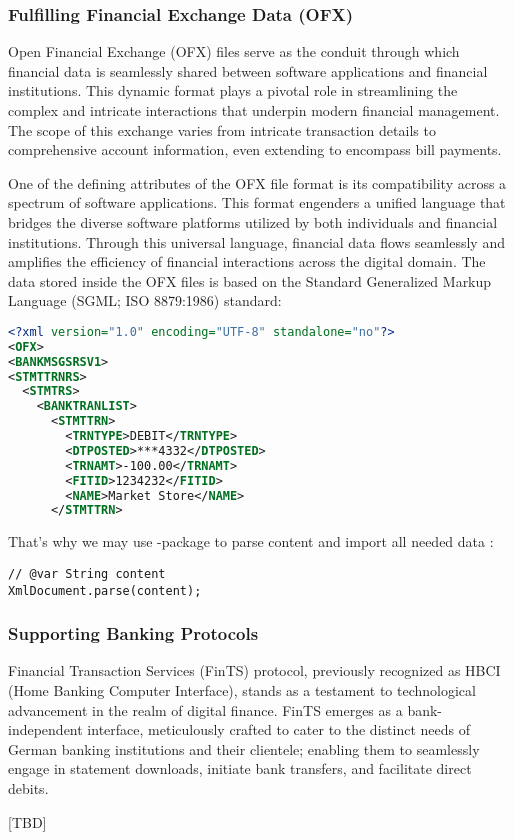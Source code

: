 \subsubsection{Fulfilling Financial Exchange Data (OFX)}

Open Financial Exchange (OFX) files serve as the conduit through which financial data is seamlessly shared between 
software applications and financial institutions. This dynamic format plays a pivotal role in streamlining the complex 
and intricate interactions that underpin modern financial management. The scope of this exchange varies from intricate 
transaction details to comprehensive account information, even extending to encompass bill payments.

One of the defining attributes of the OFX file format is its compatibility across a spectrum of software applications. 
This format engenders a unified language that bridges the diverse software platforms utilized by both individuals and 
financial institutions. Through this universal language, financial data flows seamlessly and amplifies the efficiency 
of financial interactions across the digital domain. The data stored inside the OFX files is based on the Standard 
Generalized Markup Language (SGML; ISO 8879:1986) standard:

\begin{lstlisting}[language=xml]
<?xml version="1.0" encoding="UTF-8" standalone="no"?>
<OFX>
<BANKMSGSRSV1>
<STMTTRNRS>
  <STMTRS>
    <BANKTRANLIST>
      <STMTTRN>
        <TRNTYPE>DEBIT</TRNTYPE>
        <DTPOSTED>***4332</DTPOSTED>
        <TRNAMT>-100.00</TRNAMT>
        <FITID>1234232</FITID>
        <NAME>Market Store</NAME>
      </STMTTRN>
\end{lstlisting}

\noindent That's why we may use -package to parse content and import all needed data :

\begin{lstlisting}
// @var String content
XmlDocument.parse(content);
\end{lstlisting}


\subsubsection{Supporting Banking Protocols}

Financial Transaction Services (FinTS) protocol, previously recognized as HBCI (Home Banking Computer Interface), stands 
as a testament to technological advancement in the realm of digital finance. FinTS emerges as a bank-independent 
interface, meticulously crafted to cater to the distinct needs of German banking institutions and their clientele;
enabling them to seamlessly engage in statement downloads, initiate bank transfers, and facilitate direct debits.

[TBD]
